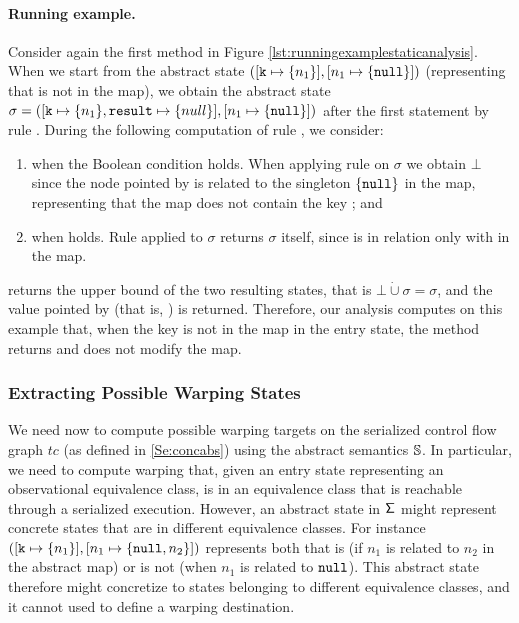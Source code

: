 \paragraph{Running example.}
Consider again the first method in Figure \ref{lst:runningexamplestaticanalysis}. When we start from the abstract state  $([\mathtt{k} \mapsto \{n_1\}], [n_1 \mapsto \{\mathtt{null}\}])$ (representing that  is not in the map), we obtain the abstract state $\sigma = ([\mathtt{k} \mapsto \{n_1\}, \mathtt{result} \mapsto \{null\}], [n_1 \mapsto \{\mathtt{null}\}])$ after the first statement by rule . During the following computation of rule , we consider:
\begin{enumerate}
	\item when the Boolean condition  holds. When applying rule  on $\sigma$ we obtain $\bot$ since the node pointed by  is related to the singleton $\{\mathtt{null}\}$ in the map, representing that the map does not contain the key ; and
	\item when  holds. Rule  applied to $\sigma$ returns $\sigma$ itself, since  is in relation only with  in the map.
\end{enumerate}
 returns the upper bound of the two resulting states, that is $\bot \dot{\cup} \sigma = \sigma$, and the value pointed by  (that is, ) is returned.
Therefore, our analysis computes on this example that, when the key is not in the map in the entry state, the method returns  and does not modify the map.

\subsubsection{Extracting Possible Warping States}

We need now to compute possible warping targets on the serialized control flow graph $tc$ (as defined in \ref{Se:concabs}) using the abstract semantics $\mathbb{S}$. In particular, we need to compute warping that, given an entry state representing an observational equivalence class, is in an equivalence class that is reachable through a serialized execution. However, an abstract state in $\mathsf{\Sigma}$ might represent concrete states that are in different equivalence classes. For instance $([\mathtt{k} \mapsto \{n_1\}], [n_1 \mapsto \{\mathtt{null}, n_2\}])$ represents both that   is (if $n_1$ is related to $n_2$ in the abstract map) or is not (when $n_1$ is related to $\mathtt{null}$). This abstract state therefore might concretize to states belonging to different equivalence classes, and it cannot used to define a warping destination.

